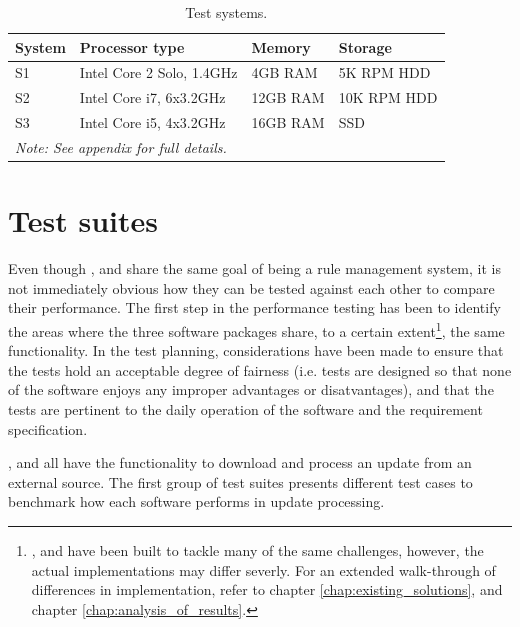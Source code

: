 \renewcommand{\arraystretch}{1.5}

\begin{table}[h!]
  \centering
  \begin{tabular}{l|l|l|l}
	System & Processor type & Memory & Storage \\
	\hline
	S1 & Intel\textregistered{} Core\texttrademark{} 2 Solo, 1.4GHz & 4GB RAM & 5K
	RPM HDD \\
	\hline
	S2 & Intel\textregistered{} Core\texttrademark{} i7, 6x3.2GHz & 12GB RAM & 10K
	RPM HDD \\
	\hline
	S3 & Intel\textregistered{} Core\texttrademark{} i5, 4x3.2GHz & 16GB RAM & SSD
	\\
	\hline
	\multicolumn{4}{l}{\textit{Note: See appendix for full details.}}
  \end{tabular}
  \caption{Test systems.}
  \label{tab:testSystems}
\end{table}

\section{Test suites}
Even though \snowman{}, \bhtb{} and \snortmanager{} share the same goal of being a
rule management system, it is not immediately obvious how they can be tested against
each other to compare their performance. The first step in the performance
testing has been to identify the areas where the three software packages share, to a
certain extent\footnote{\snowman{}, \bhtb{} and \snortmanager{} have been built
to tackle many of the same challenges, however, the actual implementations may
differ severly. For an extended walk-through of differences in implementation,
refer to chapter \ref{chap:existing_solutions}, and chapter
\ref{chap:analysis_of_results}.}, the same functionality. In the
test planning, considerations have been made to ensure that the tests hold an
acceptable degree of fairness (i.e. tests are designed so that none of the
software enjoys any improper advantages or disatvantages), and that the tests
are pertinent to the daily operation of the software and the \snowman{}
requirement specification.

\snowman{}, \bhtb{} and \snortmanager{} all have the functionality to download and
process an update from an external source. The first group of test
suites presents different test cases to benchmark how each software performs in
update processing.

